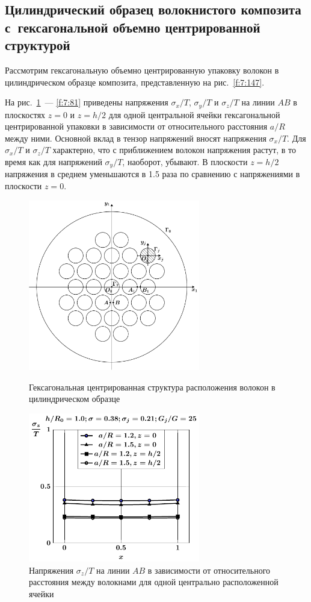 \subsection{Цилиндрический образец волокнистого композита с~гексагональной объемно центрированной структурой}

Рассмотрим гексагональную объемно центрированную упаковку волокон  в цилиндрическом образце композита, представленную на рис.~\ref{f:7:147}.

На рис.~\ref{f:7:148}~--- \ref{f:7:81} приведены напряжения $\sigma_x/T$, $\sigma_y/T$ и $\sigma_z/T$ на линии $AB$ в плоскостях $z=0$ и $z=h/2$ для одной центральной ячейки гексагональной центрированной упаковки в зависимости от относительного расстояния $a/R$ между ними. Основной вклад в тензор напряжений вносят напряжения $\sigma_x/T$. Для $\sigma_x/T$ и $\sigma_z/T$ характерно, что с приближением волокон напряжения растут, в то время как для напряжений $\sigma_y/T$, наоборот, убывают. В плоскости $z=h/2$ напряжения в среднем уменьшаются в 1.5 раза по сравнению с напряжениями в плоскости $z=0$.

\begin{figure}[h!]
\centering\footnotesize
\parbox[b]{7.5cm}{\centering\includegraphics[width=7.5cm]{inc-31.pdf}
\caption{Гексагональная центрированная структура расположения волокон в цилиндрическом образце
\label{f:7:147}}}\hfil\hfil
\parbox[b]{7.5cm}{\centering\includegraphics[width=7.5cm]{inc7-a-sig_z.pdf}
\caption{Напряжения $\sigma_z/T$ на линии $AB$ в зависимости от относительного расстояния между волокнами для одной центрально расположенной ячейки
\label{f:7:148}}}
\end{figure}

